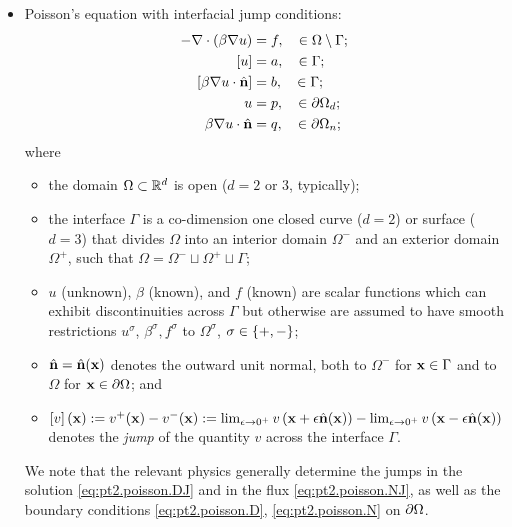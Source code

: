 \begin{itemize}

\item Poisson's equation with interfacial jump conditions:
\begin{subequations} \label{eq:pt2.poisson}
\begin{align}
-\nabla \cdot \left( \beta \nabla u \right) & = f, \quad \in \Omega \setminus \Gamma; \label{eq:pt2.poisson.PDE} \\
\left[ u \right] & = a, \quad \in \Gamma; \label{eq:pt2.poisson.DJ} \\
\left[ \beta \nabla u \cdot \hat{\mathbf{n}} \right] & = b, \quad \in \Gamma; \label{eq:pt2.poisson.NJ} \\
u & = p, \quad \in \partial\Omega_d; \label{eq:pt2.poisson.D} \\
\beta \nabla u \cdot \hat{\mathbf{n}} & = q, \quad \in \partial\Omega_n; \label{eq:pt2.poisson.N}
\end{align}
\end{subequations}
where
\begin{itemize}
\item the domain $\Omega \subset \mathbb{R}^d$ is open ($d = 2 \text{ or } 3$, typically);
\item the interface $\Gamma$ is a co-dimension one closed curve ($d = 2$) or surface ($d = 3$) that divides $\Omega$ into an interior domain $\Omega^-$ and an exterior domain $\Omega^+$, such that $\Omega = \Omega^- \sqcup \Omega^+ \sqcup \Gamma$;
\item $u$ (unknown), $\beta$ (known), and $f$ (known) are scalar functions which can exhibit discontinuities across $\Gamma$ but otherwise are assumed to have smooth restrictions $u^{\sigma}$, $\beta^{\sigma}, f^{\sigma}$ to $\Omega^{\sigma}$, $\sigma \in \left\lbrace +,- \right\rbrace$;
\item $\hat{\mathbf{n}} = \hat{\mathbf{n}}(\mathbf{x})$ denotes the outward unit normal, both to $\Omega^-$ for $\mathbf{x} \in \Gamma$ and to $\Omega$ for $\mathbf{x} \in \partial\Omega$; and
\item $\left[ v \right](\mathbf{x}) := v^+(\mathbf{x}) - v^-(\mathbf{x}) := \lim_{\epsilon \to 0^+} v\left( \mathbf{x} + \epsilon \hat{\mathbf{n}}(\mathbf{x}) \right) - \lim_{\epsilon \to 0^+} v\left( \mathbf{x} - \epsilon \hat{\mathbf{n}}(\mathbf{x}) \right)$ denotes the \emph{jump} of the quantity $v$ across the interface $\Gamma$.
\end{itemize}
We note that the relevant physics generally determine the jumps in the solution \eqref{eq:pt2.poisson.DJ} and in the flux \eqref{eq:pt2.poisson.NJ}, as well as the boundary conditions \eqref{eq:pt2.poisson.D}, \eqref{eq:pt2.poisson.N} on $\partial\Omega$.


\end{itemize}
